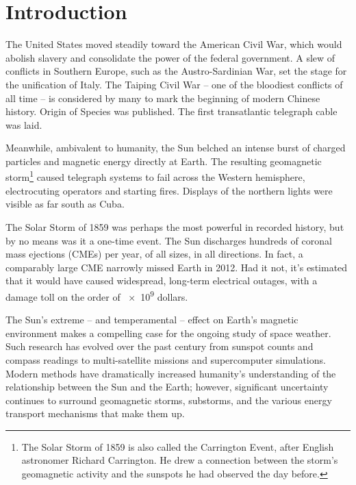 


\chapter{Introduction}
  \label{ch_intro}


 The United States moved steadily toward the American Civil War, which would abolish slavery and consolidate the power of the federal government. A slew of conflicts in Southern Europe, such as the Austro-Sardinian War, set the stage for the unification of Italy. The Taiping Civil War -- one of the bloodiest conflicts of all time -- is considered by many to mark the beginning of modern Chinese history. Origin of Species was published. The first transatlantic telegraph cable was laid.

Meanwhile, ambivalent to humanity, the Sun belched an intense burst of charged particles and magnetic energy directly at Earth. The resulting geomagnetic storm\footnote{The Solar Storm of 1859 is also called the Carrington Event, after English astronomer Richard Carrington. He drew a connection between the storm's geomagnetic activity and the sunspots he had observed the day before.} caused telegraph systems to fail across the Western hemisphere, electrocuting operators and starting fires\cite{green_2006,tsurutani_2003}. Displays of the northern lights were visible as far south as Cuba. 

The Solar Storm of 1859 was perhaps the most powerful in recorded history, but by no means was it a one-time event. The Sun discharges hundreds of coronal mass ejections (CMEs) per year, of all sizes, in all directions. In fact, a comparably large CME narrowly missed Earth in 2012\cite{nasa_2012}. Had it not, it's estimated that it would have caused widespread, long-term electrical outages, with a damage toll on the order of \num{e9} dollars\cite{lloyds_2013}. 

The Sun's extreme -- and temperamental -- effect on Earth's magnetic environment makes a compelling case for the ongoing study of space weather. Such research has evolved over the past century from sunspot counts and compass readings to multi-satellite missions and supercomputer simulations. Modern methods have dramatically increased humanity's understanding of the relationship between the Sun and the Earth; however, significant uncertainty continues to surround geomagnetic storms, substorms, and the various energy transport mechanisms that make them up. 

